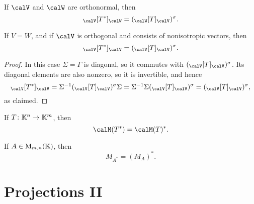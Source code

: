 \begin{corollarynoproof}
    If $\calV$ and $\calW$ are orthonormal, then
    \begin{equation*}
        \mr{\calV}{T^*}{\calW}
            = (\mr{\calW}{T}{\calV})^\sigma.
    \end{equation*}
\end{corollarynoproof}

\begin{corollary}
    \label{cor:adjoint-mr-orthogonal-basis}
    If $V = W$, and if $\calV$ is orthogonal and consists of nonisotropic vectors, then
    \begin{equation*}
        \mr{\calV}{T^*}{\calV}
            = (\mr{\calV}{T}{\calV})^\sigma.
    \end{equation*}
\end{corollary}

\begin{proof}
    In this case $\Sigma = \Gamma$ is diagonal, so it commutes with $(\mr{\calV}{T}{\calV})^\sigma$. Its diagonal elements are also nonzero, so it is invertible, and hence
    \begin{equation*}
        \mr{\calV}{T^*}{\calV}
            = \inv{\Sigma} (\mr{\calV}{T}{\calV})^\sigma \Sigma
            = \inv{\Sigma} \Sigma (\mr{\calV}{T}{\calV})^\sigma
            = (\mr{\calV}{T}{\calV})^\sigma,
    \end{equation*}
    as claimed.
\end{proof}


\begin{corollarynoproof}
    If $T \colon \mathbb{K}^n \to \mathbb{K}^m$, then
    \begin{equation*}
        \smr{T^*}
            = \smr{T}^*.
    \end{equation*}
\end{corollarynoproof}

\begin{corollarynoproof}
    If $A \in \mathrm{M}_{m,n}(\mathbb{K})$, then
    \begin{equation*}
        M_{A^*}
            = (M_A)^*.
    \end{equation*}
\end{corollarynoproof}


\section{Projections II}\label{sec:projections-2}

